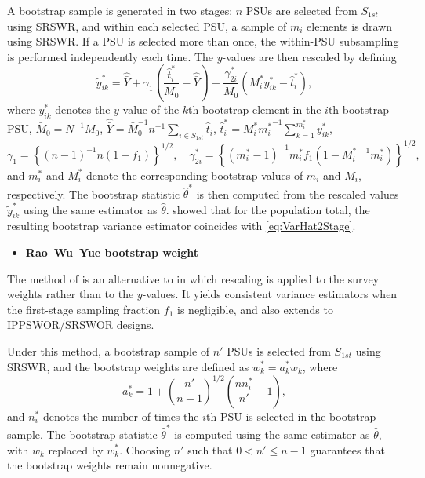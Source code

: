 A bootstrap sample is generated in two stages: \(n\) PSUs are selected from \(\textrm{$S$}_{1st}\) using SRSWR, and within each selected PSU, a sample of \(m_i\) elements is drawn using SRSWR. If a PSU is selected more than once, the within-PSU subsampling is performed independently each time. The \(y\)-values are then rescaled by defining
\[
\tilde{y}_{ik}^* = \hat{\bar{Y}}
  + \gamma_1 \left( \frac{\hat{t}_i^*}{\bar{M}_0} - \hat{\bar{Y}} \right)
  + \frac{\gamma_{2i}^*}{\bar{M}_0} \left( M_i^* y_{ik}^* - \hat{t}_i^* \right),
\]
where \(y_{ik}^*\) denotes the \(y\)-value of the \(k\)th bootstrap element in the \(i\)th bootstrap PSU, \(\bar{M}_0 = N^{-1}M_0\), \(\hat{\bar{Y}} = \bar{M}_0^{-1} n^{-1} \sum_{i \in \textrm{$S$}_{1st}} \hat{t}_i\), \(\hat{t}_i^* = M_i^* {m_i^*}^{-1} \sum_{k=1}^{m_i^*} y_{ik}^*\),
\[
    \gamma_1=\left\{ (n-1)^{-1} n (1-f_1) \right\}^{1/2}, \quad  \gamma_{2i}^*=\left\{
              (m_i^*-1)^{-1}m_i^*f_1(1- M_i^{*-1} m_i^*) \right\}^{1/2},
\]
and \(m_i^*\) and \(M_i^*\) denote the corresponding bootstrap values of \(m_i\) and \(M_i\), respectively. The bootstrap statistic \(\hat{\theta}^*\) is then computed from the rescaled values \(\tilde{y}_{ik}^*\) using the same estimator as \(\hat{\theta}\). \citet{Rao:Wu:1988} showed that for the population total, the resulting bootstrap variance estimator coincides with \eqref{eq:VarHat2Stage}.

\begin{itemize}
\tightlist
\item
  \textbf{Rao--Wu--Yue bootstrap weight}
\end{itemize}

\noindent The method of \citet{Rao:Wu:Yue:1992} is an alternative to \citet{Rao:Wu:1988} in which rescaling is applied to the survey
weights rather than to the \(y\)-values. It yields consistent variance estimators when the first-stage sampling fraction \(f_1\) is negligible, and also extends to IPPSWOR/SRSWOR designs.

Under this method, a bootstrap sample of \(n'\) PSUs is selected from \(\textrm{$S$}_{1st}\) using SRSWR, and the bootstrap weights are defined as \(w_k^* = a_k^* w_k\), where
\[
    a_k^*= 1+ \left( \frac{n'}{n-1}\right)^{1/2} \left( \frac{nn_i^*}{n'} -1 \right),
\]
and \(n_i^*\) denotes the number of times the \(i\)th PSU is selected in the bootstrap sample. The bootstrap statistic \(\hat{\theta}^*\) is computed using the same estimator as \(\hat{\theta}\), with \(w_k\) replaced by \(w_k^*\). Choosing \(n'\) such that \(0 < n' \leq n - 1\) guarantees that the bootstrap weights remain nonnegative.

